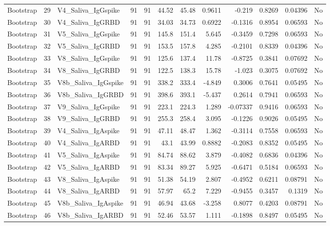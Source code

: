 \begin{longtable}{lrp{}rrrrrrrrl}
Bootstrap & 29 & V4\_Saliva\_IgGspike & 91 & 91 & 44.52 & 45.48 & 0.9611 & -0.219 & 0.8269 & 0.04396 & No \\
Bootstrap & 30 & V4\_Saliva\_IgGRBD & 91 & 91 & 34.03 & 34.73 & 0.6922 & -0.1316 & 0.8954 & 0.06593 & No \\
Bootstrap & 31 & V5\_Saliva\_IgGspike & 91 & 91 & 145.8 & 151.4 & 5.645 & -0.3459 & 0.7298 & 0.06593 & No \\
Bootstrap & 32 & V5\_Saliva\_IgGRBD & 91 & 91 & 153.5 & 157.8 & 4.285 & -0.2101 & 0.8339 & 0.04396 & No \\
Bootstrap & 33 & V8\_Saliva\_IgGspike & 91 & 91 & 125.6 & 137.4 & 11.78 & -0.8725 & 0.3841 & 0.07692 & No \\
Bootstrap & 34 & V8\_Saliva\_IgGRBD & 91 & 91 & 122.5 & 138.3 & 15.78 & -1.023 & 0.3075 & 0.07692 & No \\
Bootstrap & 35 & V8b\_Saliva\_IgGspike & 91 & 91 & 338.2 & 333.4 & -4.849 & 0.3006 & 0.7641 & 0.05495 & No \\
Bootstrap & 36 & V8b\_Saliva\_IgGRBD & 91 & 91 & 398.6 & 393.1 & -5.437 & 0.2614 & 0.7941 & 0.06593 & No \\
Bootstrap & 37 & V9\_Saliva\_IgGspike & 91 & 91 & 223.1 & 224.3 & 1.289 & -0.07337 & 0.9416 & 0.06593 & No \\
Bootstrap & 38 & V9\_Saliva\_IgGRBD & 91 & 91 & 255.3 & 258.4 & 3.095 & -0.1226 & 0.9026 & 0.05495 & No \\
Bootstrap & 39 & V4\_Saliva\_IgAspike & 91 & 91 & 47.11 & 48.47 & 1.362 & -0.3114 & 0.7558 & 0.06593 & No \\
Bootstrap & 40 & V4\_Saliva\_IgARBD & 91 & 91 & 43.1 & 43.99 & 0.8882 & -0.2083 & 0.8352 & 0.05495 & No \\
Bootstrap & 41 & V5\_Saliva\_IgAspike & 91 & 91 & 84.74 & 88.62 & 3.879 & -0.4082 & 0.6836 & 0.04396 & No \\
Bootstrap & 42 & V5\_Saliva\_IgARBD & 91 & 91 & 83.34 & 89.27 & 5.925 & -0.6471 & 0.5184 & 0.06593 & No \\
Bootstrap & 43 & V8\_Saliva\_IgAspike & 91 & 91 & 51.38 & 54.19 & 2.807 & -0.4952 & 0.6211 & 0.08791 & No \\
Bootstrap & 44 & V8\_Saliva\_IgARBD & 91 & 91 & 57.97 & 65.2 & 7.229 & -0.9455 & 0.3457 & 0.1319 & No \\
Bootstrap & 45 & V8b\_Saliva\_IgAspike & 91 & 91 & 46.94 & 43.68 & -3.258 & 0.8077 & 0.4203 & 0.08791 & No \\
Bootstrap & 46 & V8b\_Saliva\_IgARBD & 91 & 91 & 52.46 & 53.57 & 1.111 & -0.1898 & 0.8497 & 0.05495 & No \\

\end{longtable}
